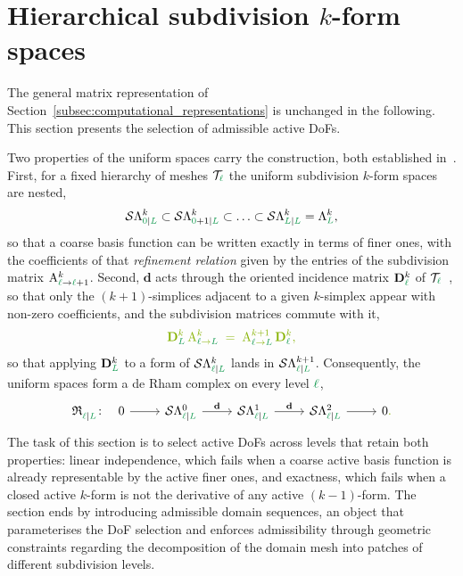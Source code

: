 \documentclass[a4paper, 12pt]{article}
\newcommand{\guidance}[1]{{\color{lime!70!black} #1}}
\newcommand{\green}{\color{ForestGreen}}
\newcommand{\T}{\mathcal{T}}
\renewcommand{\l}{{\green\ell}}
\renewcommand{\L}{{\green L}}
\newcommand{\lzero}{{\green 0}}
\newcommand{\constrVec}[4]{ {#1}^{#2}_{#3 \vert #4} }
\newcommand{\Amat}[3]{\mathbf{\mathrm{A}}^{#1}_{#2 \to #3}}
\newcommand{\extd}{\mathbf{d}}
\newcommand{\Dmat}[2]{\mathbf{D}^{#1}_{#2}} %
\newcommand{\FEECspace}[2]{\Lambda^{#1}_{#2}}
\newcommand{\SDFspace}[3]{\mathcal{S}\Lambda^{#1}_{#2 \vert #3}}
\theoremstyle{definition}
\theoremstyle{plain}
\numberwithin{equation}{section}
\begin{document}
\FloatBarrier

\section{Hierarchical subdivision $k$-form spaces}
\label{sec:construction_of_hierarchical_subdiv_spaces}

The general matrix representation of Section~\ref{subsec:computational_representations} is unchanged in the following. This section presents the selection of admissible active DoFs.

Two properties of the uniform spaces carry the construction, both established in~\cite{Piel.2026}. First, for a fixed hierarchy of meshes $\T_\l$ the uniform subdivision $k$-form spaces are nested,
\begin{equation}
    \label{eq:nested_spaces}
    \SDFspace{k}{\lzero}{\L} \subset \SDFspace{k}{\lzero+1}{\L} \subset \hdots \subset \SDFspace{k}{\L}{\L} = \FEECspace{k}{\L},
\end{equation}
so that a coarse basis function can be written exactly in terms of finer ones, with the coefficients of that \emph{refinement relation} given by the entries of the subdivision matrix $\Amat{k}{\l}{\l+1}$. \guidance{Second, $\extd$ acts through the oriented incidence matrix $\Dmat{k}{\l}$ of $\T_\l$~\citep{Hirani.2003,Desbrun.2006}, so that only the $(k\!+\!1)$-simplices adjacent to a given $k$-simplex appear with non-zero coefficients, and the subdivision matrices commute with it,}
\begin{equation}
    \label{eq:commuting_property}
    \guidance{\Dmat{k}{\L} \, \Amat{k}{\l}{\L} \; = \; \Amat{k+1}{\l}{\L} \, \Dmat{k}{\l},}
\end{equation}
\guidance{so that applying $\Dmat{k}{\L}$ to a form of $\SDFspace{k}{\l}{\L}$ lands in $\SDFspace{k+1}{\l}{\L}$. Consequently,} the uniform spaces form a de Rham complex on every level $\l$,
\begin{equation}
\begin{tikzcd}
  \constrVec{\mathfrak{R}}{}{\l}{\L}\colon \quad 0 \arrow[r] & \SDFspace{0}{\l}{\L} \arrow[r, "\extd"] & \SDFspace{1}{\l}{\L} \arrow[r, "\extd"] & \SDFspace{2}{\l}{\L} \arrow[r] & 0\guidance{.}
\end{tikzcd}
\end{equation}
The task of this section is to select active DoFs across levels that retain both properties: linear independence, which fails when a coarse active basis function is already representable by the active finer ones, \guidance{and exactness, which fails when a closed active $k$-form is not the derivative of any active $(k\!-\!1)$-form.} The section ends by introducing admissible domain sequences, an object that parameterises the DoF selection and enforces admissibility through geometric constraints regarding the decomposition of the domain mesh into patches of different subdivision levels.
\end{document}
